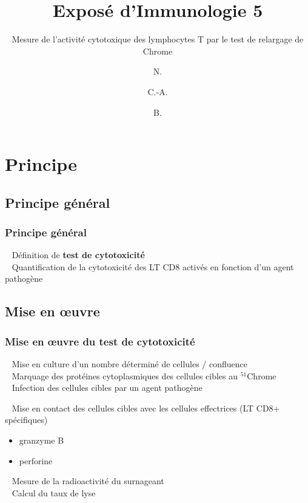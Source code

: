 \documentclass[12pt]{beamer}
\author{N. \bsc{Ribero-Rios} \and C.-A. \bsc{Romain} \and B. \bsc{Rouger}}
\title{Exposé d'Immunologie 5}
\subtitle{Mesure de l’activité cytotoxique des lymphocytes T par le test de relargage de Chrome}
\date{}
\begin{document}
\maketitle


\begin{frame}
  \transuncover
  \tableofcontents
\end{frame}


\section{Principe}
\subsection{Principe général}
\begin{frame}
  \transuncover
  \frametitle{Principe général}
  
  \textbullet~ Définition de \textbf{test de cytotoxicité}\\
  \vfill
  \textbullet~ Quantification de la cytotoxicité des LT CD8 activés en fonction d'un agent pathogène
  
\end{frame}


\subsection{Mise en \oe{}uvre}
\begin{frame}
  \transuncover
  \frametitle{Mise en \oe{}uvre du test de cytotoxicité}

  \begin{minipage}{0.45\linewidth}
    \textbullet~ Mise en culture d'un nombre déterminé de cellules / confluence\\
    \textbullet~ Marquage des protéines cytoplasmiques des cellules cibles au $^{51}$Chrome\\
    \textbullet~ Infection des cellules cibles par un agent pathogène
  \end{minipage}
  \hfill
  \vline
  \hfill
  \begin{minipage}{0.45\linewidth}
    \textbullet~ Mise en contact des cellules cibles avec les cellules effectrices (LT CD8+ spécifiques)
      \begin{itemize}
      \item granzyme B
      \item perforine
      \end{itemize}
    \textbullet~ Mesure de la radioactivité du surnageant\\
    \textbullet~ Calcul du taux de lyse
  \end{minipage}
\end{frame}
\end{document}
